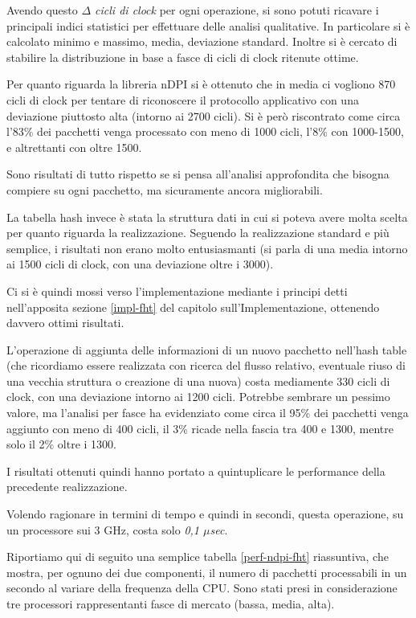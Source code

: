 Avendo questo \textit{$\Delta$ cicli di clock} per ogni operazione, si sono potuti ricavare i principali indici statistici per effettuare delle analisi qualitative. In particolare si è calcolato minimo e massimo, media, deviazione standard. Inoltre si è cercato di stabilire la distribuzione in base a fasce di cicli di clock ritenute ottime.

Per quanto riguarda la libreria nDPI si è ottenuto che in media ci vogliono 870 cicli di clock per tentare di riconoscere il protocollo applicativo con una deviazione piuttosto alta (intorno ai 2700 cicli). Si è però riscontrato come circa l'83\% dei pacchetti venga processato con meno di 1000 cicli, l'8\% con 1000-1500, e altrettanti con oltre 1500.

Sono risultati di tutto rispetto se si pensa all'analisi approfondita che bisogna compiere su ogni pacchetto, ma sicuramente ancora migliorabili.

La tabella hash invece è stata la struttura dati in cui si poteva avere molta scelta per quanto riguarda la realizzazione. Seguendo la realizzazione standard e più semplice, i risultati non erano molto entusiasmanti (si parla di una media intorno ai 1500 cicli di clock, con una deviazione oltre i 3000).

Ci si è quindi mossi verso l'implementazione mediante i principi detti nell'apposita sezione \ref{impl-fht} del capitolo sull'Implementazione, ottenendo davvero ottimi risultati.

\clearpage
L'operazione di aggiunta delle informazioni di un nuovo pacchetto nell'hash table (che ricordiamo essere realizzata con ricerca del flusso relativo, eventuale riuso di una vecchia struttura o creazione di una nuova) costa mediamente 330 cicli di clock, con una deviazione intorno ai 1200 cicli. Potrebbe sembrare un pessimo valore, ma l'analisi per fasce ha evidenziato come circa il 95\% dei pacchetti venga aggiunto con meno di 400 cicli, il 3\% ricade nella fascia tra 400 e 1300, mentre solo il 2\% oltre i 1300.

I risultati ottenuti quindi hanno portato a quintuplicare le performance della precedente realizzazione.

Volendo ragionare in termini di tempo e quindi in secondi, questa operazione, su un processore sui 3 GHz, costa solo \textit{0,1 $\mu$sec}.

Riportiamo qui di seguito una semplice tabella \ref{perf-ndpi-fht} riassuntiva, che mostra, per ognuno dei due componenti, il numero di pacchetti processabili in un secondo al variare della frequenza della CPU. Sono stati presi in considerazione tre processori rappresentanti fasce di mercato (bassa, media, alta).


